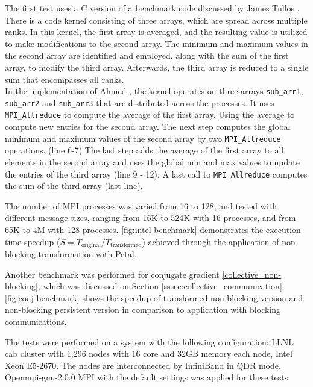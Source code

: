 The first test uses a C version of a benchmark code discussed by James Tullos \cite{Tullos_2014}. 
There is a code kernel consisting of three arrays, which are spread across multiple ranks. 
In this kernel, the first array is averaged, and the resulting value is utilized to make modifications to the second array. 
The minimum and maximum values in the second array are identified and employed, along with the sum of the first array, to modify the third array. 
Afterwards, the third array is reduced to a single sum that encompasses all ranks.\\
In the implementation of Ahmed \cite{ahmed_transforming_2017}, the kernel operates on three arrays \texttt{sub\_arr1}, \texttt{sub\_arr2} and \texttt{sub\_arr3} that are distributed across the processes. 
It uses \texttt{MPI\_Allreduce} to compute the average of the first array.
Using the average to compute new entries for the second array. 
The next step computes the global minimum and maximum values of the second array by two \texttt{MPI\_Allreduce} operations. (line 6-7)
The last step adds the average of the first array to all elements in the second array and uses the global min and max values to update the entries of the third array (line 9 - 12).
A last call to \texttt{MPI\_Allreduce} computes the sum of the third array (last line).

The number of MPI processes was varied  from 16 to 128, and tested with different message sizes, ranging from 16K to 524K with 16 processes, and from 65K to 4M with 128 processes.
\autoref{fig:intel-benchmark} demonstrates the execution time speedup ($S = T_{\text{original}}/T_{\text{transformed}}$) achieved through the application of non-blocking transformation with Petal.

Another benchmark was performed for conjugate gradient \autoref{collective_non-blocking}, which was discussed on Section \ref{sssec:collective_communication}. 
\autoref{fig:conj-benchmark} shows the speedup of transformed non-blocking version and non-blocking persistent version in comparison to application with blocking communications.

The tests were performed on a system with the following configuration:
LLNL cab cluster with 1,296 nodes with 16 core and 32GB memory each node, Intel Xeon E5-2670. 
The nodes are interconnected by InfiniBand in QDR mode. Openmpi-gnu-2.0.0 MPI with the default settings was applied for these tests.

